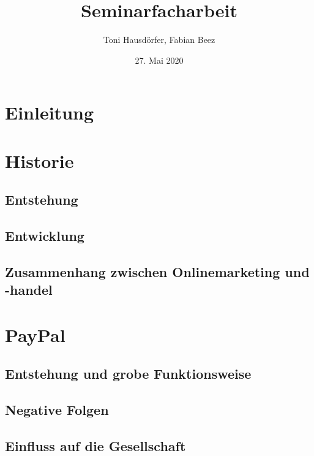 \documentclass[a4paper, 12pt]{scrartcl}
\title{Seminarfacharbeit}
\author{Toni Hausdörfer, Fabian Beez}
\date{27. Mai 2020}
\begin{document}
    
    
    
    

    \tableofcontents 
        \newpage

    \section{Einleitung}
        
        \newpage
    
    
    
    \section{Historie}
            
        \subsection{Entstehung}
            
        \subsection{Entwicklung}
            
        \subsection{Zusammenhang zwischen Onlinemarketing und -handel}
            
        \newpage
        
        
        
    \section{PayPal}
		
        \subsection{Entstehung und grobe Funktionsweise}
            
        \subsection{Negative Folgen}
            
        \subsection{Einfluss auf die Gesellschaft}
            
        \newpage
        
\end{document}
